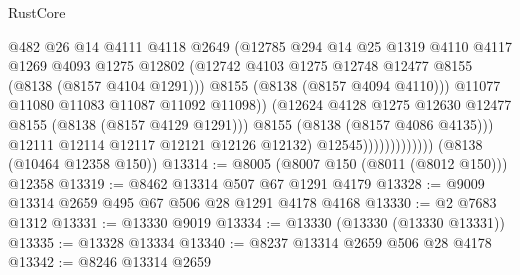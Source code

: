 \begin{lexlean}{RustCore}
\begin{coremodule}
                                      @482
                                      @26
                                      @14
                                      @4111
                                      @4118
                                      @2649
                                      (@12785
                                        @294
                                        @14
                                        @25
                                        @1319
                                        @4110
                                        @4117
                                        @1269
                                        @4093
                                        @1275
                                        @12802
                                        (@12742
                                          @4103
                                          @1275
                                          @12748
                                          @12477
                                          @8155
                                          (@8138 (@8157 @4104 @1291)))
                                        @8155
                                        (@8138 (@8157 @4094 @4110)))
                                      @11077
                                      @11080
                                      @11083
                                      @11087
                                      @11092
                                      @11098))
                                  (@12624
                                    @4128
                                    @1275
                                    @12630
                                    @12477
                                    @8155
                                    (@8138 (@8157 @4129 @1291)))
                                  @8155
                                  (@8138 (@8157 @4086 @4135)))
                                @12111
                                @12114
                                @12117
                                @12121
                                @12126
                                @12132)
                              @12545)))))))))))))
    (@8138 (@10464 @12358 @150))
@13314 := @8005 (@8007 @150 (@8011 (@8012 @150))) @12358
@13319 := @8462 @13314 @507 @67 @1291 @4179
@13328 := @9009 @13314 @2659 @495 @67 @506 @28 @1291 @4178 @4168
@13330 := @2 @7683 @1312
@13331 := @13330 @9019
@13334 := @13330 (@13330 (@13330 @13331))
@13335 := @13328 @13334
@13340 := @8237 @13314 @2659 @506 @28 @4178
@13342 := @8246 @13314 @2659

\end{coremodule}
\end{lexlean}
